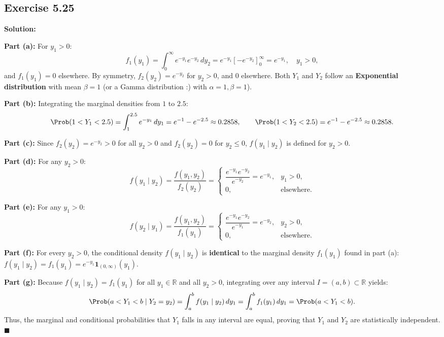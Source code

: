 \documentclass[11pt, letterpaper]{article}
\begin{document}
\subsection{Exercise 5.25}

\textbf{Solution:}

\textbf{Part (a):} For $y_1 > 0$:
\[ f_1(y_1) = \int_0^\infty e^{-y_1} e^{-y_2} \, dy_2 = e^{-y_1} \left[ -e^{-y_2} \right]_0^\infty = e^{-y_1}, \quad y_1 > 0, \]
and $f_1(y_1) = 0$ elsewhere. By symmetry, $f_2(y_2) = e^{-y_2}$ for $y_2 > 0$, and $0$ elsewhere. Both $Y_1$ and $Y_2$ follow an \textbf{Exponential distribution} with mean $\beta = 1$ (or a Gamma distribution :) with $\alpha = 1, \beta = 1$).

\textbf{Part (b):} Integrating the marginal densities from $1$ to $2.5$:
\[ \Prob(1 < Y_1 < 2.5) = \int_1^{2.5} e^{-y_1} \, dy_1 = e^{-1} - e^{-2.5} \approx 0.2858, \qquad \Prob(1 < Y_2 < 2.5) = e^{-1} - e^{-2.5} \approx 0.2858. \]

\textbf{Part (c):} Since $f_2(y_2) = e^{-y_2} > 0$ for all $y_2 > 0$ and $f_2(y_2) = 0$ for $y_2 \le 0$, $f(y_1 \mid y_2)$ is defined for $y_2 > 0$.

\textbf{Part (d):} For any $y_2 > 0$:
\[ f(y_1 \mid y_2) = \frac{f(y_1, y_2)}{f_2(y_2)} = \begin{cases} \dfrac{e^{-y_1}e^{-y_2}}{e^{-y_2}} = e^{-y_1}, & y_1 > 0, \\ 0, & \text{elsewhere.} \end{cases} \]

\textbf{Part (e):} For any $y_1 > 0$:
\[ f(y_2 \mid y_1) = \frac{f(y_1, y_2)}{f_1(y_1)} = \begin{cases} \dfrac{e^{-y_1}e^{-y_2}}{e^{-y_1}} = e^{-y_2}, & y_2 > 0, \\ 0, & \text{elsewhere.} \end{cases} \]

\textbf{Part (f):} For every $y_2 > 0$, the conditional density $f(y_1 \mid y_2)$ is \textbf{identical} to the marginal density $f_1(y_1)$ found in part (a): $f(y_1 \mid y_2) = f_1(y_1) = e^{-y_1} \mathbf{1}_{(0, \infty)}(y_1)$.

\textbf{Part (g):} Because $f(y_1 \mid y_2) = f_1(y_1)$ for all $y_1 \in \mathbb{R}$ and all $y_2 > 0$, integrating over any interval $I = (a, b) \subset \mathbb{R}$ yields:
\[ \Prob(a < Y_1 < b \mid Y_2 = y_2) = \int_a^b f(y_1 \mid y_2) \, dy_1 = \int_a^b f_1(y_1) \, dy_1 = \Prob(a < Y_1 < b). \]
Thus, the marginal and conditional probabilities that $Y_1$ falls in any interval are equal, proving that $Y_1$ and $Y_2$ are statistically independent. $\blacksquare$
\end{document}
